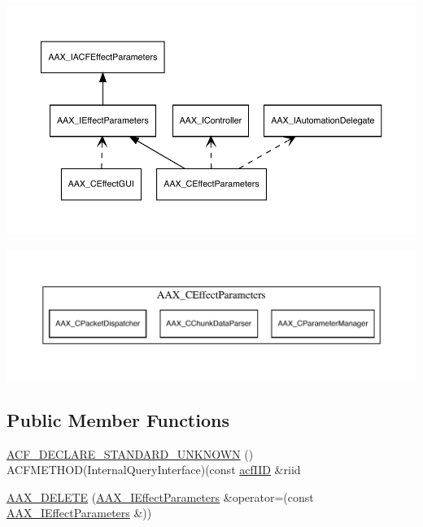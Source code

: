 \begin{DoxyImage}
\includegraphics[width=\textwidth,height=\textheight/2,keepaspectratio=true]{dot_aax_ieffectparams_related}
\end{DoxyImage}

\begin{DoxyImage}
\includegraphics[width=\textwidth,height=\textheight/2,keepaspectratio=true]{dot_aax_ieffectparams_contained}
\end{DoxyImage}
\subsection*{Public Member Functions}
\begin{DoxyCompactItemize}
\item 
\mbox{\hyperlink{a01825_a6be6ecdd9b96ca0d7723995e6dd4e478}{A\+C\+F\+\_\+\+D\+E\+C\+L\+A\+R\+E\+\_\+\+S\+T\+A\+N\+D\+A\+R\+D\+\_\+\+U\+N\+K\+N\+O\+WN}} () A\+C\+F\+M\+E\+T\+H\+OD(Internal\+Query\+Interface)(const \mbox{\hyperlink{a00269_a59df0b41744eee7a066787aaedf97f67}{acf\+I\+ID}} \&riid
\item 
\mbox{\hyperlink{a01825_ac3fdd3463ee1eeef3fb4a47750f71511}{A\+A\+X\+\_\+\+D\+E\+L\+E\+TE}} (\mbox{\hyperlink{a01825}{A\+A\+X\+\_\+\+I\+Effect\+Parameters}} \&operator=(const \mbox{\hyperlink{a01825}{A\+A\+X\+\_\+\+I\+Effect\+Parameters}} \&))
\end{DoxyCompactItemize}
